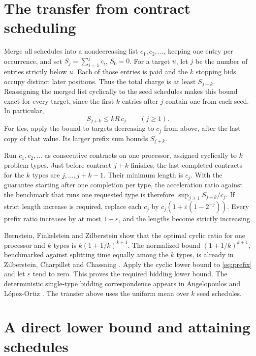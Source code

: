 \documentclass[11pt,a4paper]{amsart}
\begin{document}
\section{The transfer from contract scheduling}

Merge all schedules into a nondecreasing list \(c_1,c_2,\ldots\), keeping one entry per occurrence, and set \(S_j=\sum_{i=1}^j c_i\), \(S_0=0\). For a target \(u\), let \(j\) be the number of entries strictly below \(u\). Each of those entries is paid and the \(k\) stopping bids occupy distinct later positions. Thus the total charge is at least \(S_{j+k}\). Reassigning the merged list cyclically to the seed schedules makes this bound exact for every target, since the first \(k\) entries after \(j\) contain one from each seed. In particular,
\begin{equation}\label{eq:prefix}
 S_{j+k}\le kR\,c_j \qquad (j\ge1).
\end{equation}
For ties, apply the bound to targets decreasing to \(c_j\) from above, after the last copy of that value. Its larger prefix sum bounds \(S_{j+k}\).

Run \(c_1,c_2,\ldots\) as consecutive contracts on one processor, assigned cyclically to \(k\) problem types. Just before contract \(j+k\) finishes, the last completed contracts for the \(k\) types are \(j,\ldots,j+k-1\). Their minimum length is \(c_j\). With the guarantee starting after one completion per type, the acceleration ratio against the benchmark that runs one requested type is therefore \(\sup_{j\ge1} S_{j+k}/c_j\). If strict length increase is required, replace each \(c_j\) by \(c_j(1+\varepsilon(1-2^{-j}))\). Every prefix ratio increases by at most \(1+\varepsilon\), and the lengths become strictly increasing.

Bernstein, Finkelstein and Zilberstein \cite[Lemma~1 and Thm.~2]{bfz} show that the optimal cyclic ratio for one processor and \(k\) types is \(k(1+1/k)^{k+1}\). The normalized bound \((1+1/k)^{k+1}\), benchmarked against splitting time equally among the \(k\) types, is already in Zilberstein, Charpillet and Chassaing \cite[Lemma~2 and Thm.~3]{zcc}. Apply the cyclic lower bound to \eqref{eq:prefix} and let \(\varepsilon\) tend to zero. This proves the required bidding lower bound. The deterministic single-type bidding correspondence appears in Angelopoulos and L\'opez-Ortiz \cite[\S2]{alo}. The transfer above uses the uniform mean over \(k\) seed schedules.

\section{A direct lower bound and attaining schedules}
\end{document}
